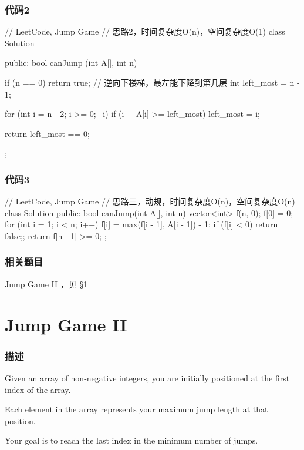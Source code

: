 \subsubsection{代码2}
\begin{Code}
// LeetCode, Jump Game
// 思路2，时间复杂度O(n)，空间复杂度O(1)
class Solution {
public:
    bool canJump (int A[], int n) {
        if (n == 0) return true;
        // 逆向下楼梯，最左能下降到第几层
        int left_most = n - 1;

        for (int i = n - 2; i >= 0; --i)
            if (i + A[i] >= left_most)
                left_most = i;

        return left_most == 0;
    }
};
\end{Code}


\subsubsection{代码3}
\begin{Code}
// LeetCode, Jump Game
// 思路三，动规，时间复杂度O(n)，空间复杂度O(n)
class Solution {
public:
    bool canJump(int A[], int n) {
        vector<int> f(n, 0);
        f[0] = 0;
        for (int i = 1; i < n; i++) {
            f[i] = max(f[i - 1], A[i - 1]) - 1;
            if (f[i] < 0) return false;;
        }
        return f[n - 1] >= 0;
    }
};
\end{Code}


\subsubsection{相关题目}
\begindot
\item Jump Game II ，见 \S \ref{sec:jump-game-ii}
\myenddot


\section{Jump Game II} %
\label{sec:jump-game-ii}


\subsubsection{描述}
Given an array of non-negative integers, you are initially positioned at the first index of the array.

Each element in the array represents your maximum jump length at that position.

Your goal is to reach the last index in the minimum number of jumps.

